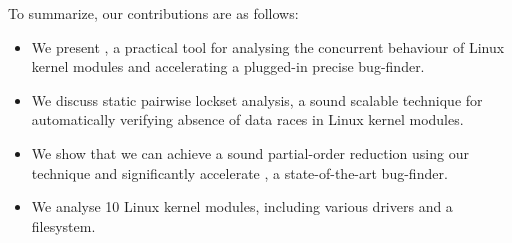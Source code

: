 To summarize, our contributions are as follows:
\begin{itemize}
\item We present \whoop, a practical tool for analysing the concurrent behaviour of Linux kernel modules and accelerating a plugged-in precise bug-finder.
\item We discuss static pairwise lockset analysis,  a sound scalable technique for automatically verifying absence of data races in Linux kernel modules.
\item We show that we can achieve a sound partial-order reduction using our technique and significantly accelerate \corral, a state-of-the-art bug-finder.
\item We analyse 10 Linux kernel modules, including various drivers and a filesystem.
\end{itemize}